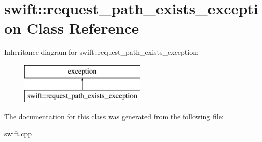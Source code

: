 \hypertarget{classswift_1_1request__path__exists__exception}{\section{swift\-:\-:request\-\_\-path\-\_\-exists\-\_\-exception Class Reference}
\label{classswift_1_1request__path__exists__exception}
}
Inheritance diagram for swift\-:\-:request\-\_\-path\-\_\-exists\-\_\-exception\-:\begin{figure}[H]
\begin{center}
\leavevmode
\includegraphics[height=2.000000cm]{classswift_1_1request__path__exists__exception}
\end{center}
\end{figure}


The documentation for this class was generated from the following file\-:\begin{DoxyCompactItemize}
\item 
swift.\-cpp\end{DoxyCompactItemize}
